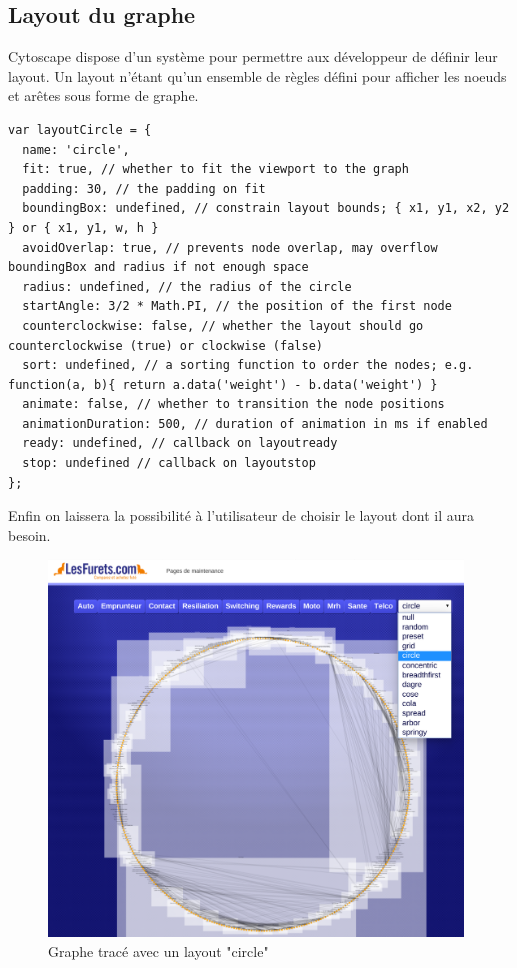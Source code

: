 \subsection{Layout du graphe}
Cytoscape dispose d'un système pour permettre aux développeur de définir leur layout. Un layout n'étant qu'un ensemble de règles défini pour afficher les noeuds et arêtes sous forme de graphe.
\begin{lstlisting}[caption=Exemple d'un layout traçant le graphe sous forme de cercle]
var layoutCircle = {
  name: 'circle',
  fit: true, // whether to fit the viewport to the graph
  padding: 30, // the padding on fit
  boundingBox: undefined, // constrain layout bounds; { x1, y1, x2, y2 } or { x1, y1, w, h }
  avoidOverlap: true, // prevents node overlap, may overflow boundingBox and radius if not enough space
  radius: undefined, // the radius of the circle
  startAngle: 3/2 * Math.PI, // the position of the first node
  counterclockwise: false, // whether the layout should go counterclockwise (true) or clockwise (false)
  sort: undefined, // a sorting function to order the nodes; e.g. function(a, b){ return a.data('weight') - b.data('weight') }
  animate: false, // whether to transition the node positions
  animationDuration: 500, // duration of animation in ms if enabled
  ready: undefined, // callback on layoutready
  stop: undefined // callback on layoutstop
};
\end{lstlisting}
Enfin on laissera la possibilité à l'utilisateur de choisir le layout dont il aura besoin.
\begin{figure}[!h]
\centering
\includegraphics[height=10cm]{outil/layout-circle.png}
\caption{Graphe tracé avec un layout "circle"}
\end{figure}

